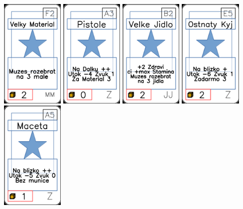 \documentclass[a4paper]{article}
\begin{document}
	\includegraphics[width=3.0cm]{img-1_56}
	\includegraphics[width=3.0cm]{img-1_92}
	\includegraphics[width=3.0cm]{img-1_36}
	\includegraphics[width=3.0cm]{img-1_84}
	\includegraphics[width=3.0cm]{img-1_94}
\end{document}
